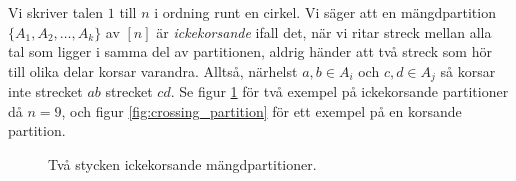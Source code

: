 \documentclass[nobib]{tufte-handout}
\begin{document}
\begin{xca}
    Vi skriver talen $1$ till $n$ i ordning runt en cirkel. Vi säger att en mängdpartition $\{A_1, A_2, \ldots, A_k\}$ av $[n]$ är \emph{ickekorsande} ifall det, när vi ritar streck mellan alla tal som ligger i samma del av partitionen, aldrig händer att två streck som hör till olika delar korsar varandra. Alltså, närhelst $a, b \in A_i$ och $c, d \in A_j$ så korsar inte strecket $ab$ strecket $cd$. Se figur \ref{fig:two_noncrossing_partitions} för två exempel på ickekorsande partitioner då $n=9$, och figur \ref{fig:crossing_partition} för ett exempel på en korsande partition.
    
    \begin{figure}
        \centering
        \quad
        
        \caption{Två stycken ickekorsande mängdpartitioner.}
        \label{fig:two_noncrossing_partitions}
    \end{figure}


\end{xca}
\end{document}
